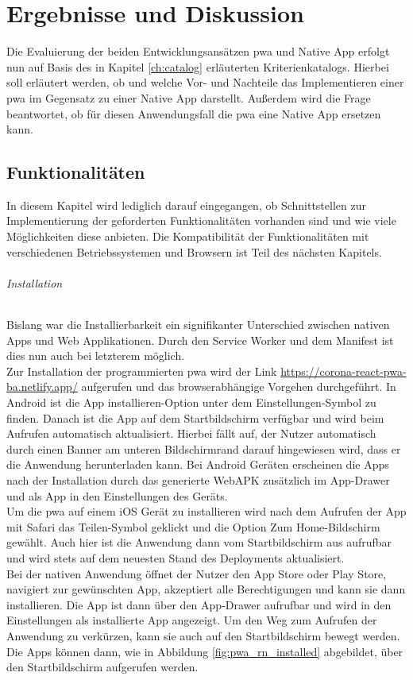 \chapter{Ergebnisse und Diskussion}\label{ch:results}
Die Evaluierung der beiden Entwicklungsansätzen \ac{pwa} und Native App erfolgt nun auf Basis des in Kapitel \ref{ch:catalog} erläuterten Kriterienkatalogs.
Hierbei soll erläutert werden, ob und welche Vor- und Nachteile das Implementieren einer \ac{pwa} im Gegensatz zu einer Native App darstellt.
Außerdem wird die Frage beantwortet, ob für diesen Anwendungsfall die \ac{pwa} eine Native App ersetzen kann.

\section{Funktionalitäten}
In diesem Kapitel wird lediglich darauf eingegangen, ob Schnittstellen zur Implementierung der geforderten Funktionalitäten vorhanden sind und wie viele Möglichkeiten diese anbieten.
Die Kompatibilität der Funktionalitäten mit verschiedenen Betriebssystemen und Browsern ist Teil des nächsten Kapitels.

\subparagraph{Installation\\}
Bislang war die Installierbarkeit ein signifikanter Unterschied zwischen nativen Apps und Web Applikationen.
Durch den Service Worker und dem Manifest ist dies nun auch bei letzterem möglich.\\
Zur Installation der programmierten \ac{pwa} wird der Link \url{https://corona-react-pwa-ba.netlify.app/} aufgerufen und das browserabhängige Vorgehen durchgeführt.
In Android ist die \glqq App installieren\grqq{}-Option unter dem Einstellungen-Symbol zu finden.
Danach ist die App auf dem Startbildschirm verfügbar und wird beim Aufrufen automatisch aktualisiert.
Hierbei fällt auf, der Nutzer automatisch durch einen Banner am unteren Bildschirmrand darauf hingewiesen wird, dass er die Anwendung herunterladen kann.
Bei Android Geräten erscheinen die Apps nach der Installation durch das generierte WebAPK zusätzlich im App-Drawer und als App in den Einstellungen des Geräts.\\
Um die \ac{pwa} auf einem iOS Gerät zu installieren wird nach dem Aufrufen der App mit Safari das Teilen-Symbol geklickt und die Option \glqq Zum Home-Bildschirm\grqq{} gewählt.
Auch hier ist die Anwendung dann vom Startbildschirm aus aufrufbar und wird stets auf dem neuesten Stand des Deployments aktualisiert.\\
Bei der nativen Anwendung öffnet der Nutzer den App Store oder Play Store, navigiert zur gewünschten App, akzeptiert alle Berechtigungen und kann sie dann installieren.
Die App ist dann über den App-Drawer aufrufbar und wird in den Einstellungen als installierte App angezeigt.
Um den Weg zum Aufrufen der Anwendung zu verkürzen, kann sie auch auf den Startbildschirm bewegt werden.\\
Die Apps können dann, wie in Abbildung \ref{fig:pwa_rn_installed} abgebildet, über den Startbildschirm aufgerufen werden.


